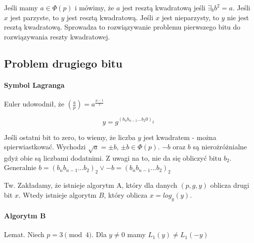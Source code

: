 \documentclass{report}
\begin{document}
Jeśli mamy $a \in \Phi(p)$ i mówimy, że $a$ jest resztą kwadratową jeśli $\exists_b b^2 = a$. Jeśli $x$ jest parzyste, to $y$ jest resztą kwadratową. Jeśli $x$ jest nieparzysty, to $y$ nie jest resztą kwadratową. Sprowadza to rozwiązywanie problemu pierwszego bitu do rozwiązywania reszty kwadratowej.

\subsection{Problem drugiego bitu}

\paragraph{Symbol Lagranga}

Euler udowodnił, że $\left( \frac{a}{p} \right) = a^{\frac{p-1}{2}}$

$$ y = g^{(b_nb_{n-1}\dots b_2 0)_2} $$

Jeśli ostatni bit to zero, to wiemy, że liczba $y$ jest kwadratem - można spierwiastkować. Wychodzi $\sqrt{a} = \pm b$, $\pm b \in \Phi(p)$. $-b$ oraz $b$ są nierożróżnialne gdyż obie są liczbami dodatnimi. Z uwagi na to, nie da się obliczyć bitu $b_2$. Generalnie $b = (b_nb_{n-1}\dots b_2)_2 \lor -b = (b_nb_{n-1}\dots b_2)_2$

Tw. Zakładamy, że istnieje algorytm A, który dla danych $(p, g, y)$ oblicza drugi bit $x$. Wtedy istnieje algorytm $B$, który oblicza $x = log_g(y)$.

\paragraph{Algorytm B}


Lemat. Niech $p = 3 \pmod{4}$. Dla $y \neq 0$ mamy $L_1(y) \neq L_1(-y)$
\end{document}

